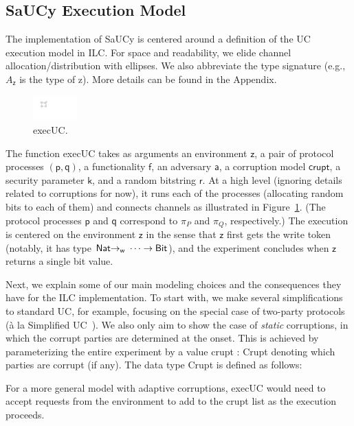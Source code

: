\subsection{SaUCy Execution Model}
\label{subsec:concrete-uc}


The implementation of SaUCy is centered around a definition of the UC execution
model in ILC. For space and readability, we elide channel
allocation/distribution with ellipses. We also abbreviate the type signature
(e.g., $A_{\mathsf{z}}$ is the type of \textsf{z}). More details can be found in
the Appendix.


\begingroup
\setlength\intextsep{0pt}
\setlength{\columnsep}{10pt}
\begin{figure}
\centering
\includegraphics[width=0.15\textwidth]{graphics/execUC}
\caption{\textsf{execUC}.}
\label{fig:execUC-diagram}
\end{figure}
The function \textsf{execUC} takes as arguments an environment $\mathsf{z}$, a
pair of protocol processes $(\mathsf{p},\mathsf{q})$, a functionality
$\mathsf{f}$, an adversary $\mathsf{a}$, a corruption model $\mathsf{crupt}$, a
security parameter $\mathsf{k}$, and a random bitstring $\mathsf{r}$. At a high
level (ignoring details related to corruptions for now), it runs each of the
processes (allocating random bits to each of them) and connects channels as
illustrated in Figure~\ref{fig:execUC-diagram}.
(The protocol processes
$\mathsf{p}$ and $\mathsf{q}$ correspond to $\pi_P$ and $\pi_Q$, respectively.)
The execution is centered on the environment $\mathsf{z}$ in the sense that
$\mathsf{z}$ first gets the write token (notably, it has type $\mathsf{Nat}
{->}_{\textsf{w}}\ \cdots -> \textnormal{\textsf{Bit}}$), and the experiment concludes when $\mathsf{z}$
returns a single bit value.

Next, we explain some of our main modeling choices and the consequences they
have for the ILC implementation. To start with, we make several simplifications
to standard UC, for example, focusing on the special case of two-party protocols
(\`{a} la Simplified UC~\cite{canetti2015simpler}).  We also only aim to show
the case of \emph{static} corruptions, in which the corrupt parties are
determined at the onset.  This is achieved by parameterizing the entire
experiment by a value \textsf{crupt : Crupt} denoting which parties are corrupt (if
any). The data type \textsf{Crupt} is defined as follows:

For a more general model with adaptive corruptions, \textsf{execUC} would need
to accept requests from the environment to add to the \textsf{crupt} list as the
execution proceeds.
\endgroup

